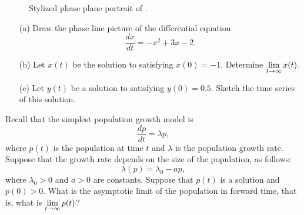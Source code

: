 \documentclass{ximera}
\begin{document}
\begin{figure}[htb]
           \centerline{%
           }
           \caption{Stylized phase plane portrait of \protect{}.}
           \label{F:gradexamstyle}
\end{figure}

\EXER

\TEXER

\begin{exercise} \label{c8.2.1}
\begin{enumerate}
\item[(a)] Draw the phase line picture of the differential
equation 
\begin{equation}  \label{E:quad}
\frac{dx}{dt} = -x^2 +3x -2.
\end{equation}
\item[(b)] Let $x(t)$ be the solution to  satisfying
$x(0)=-1$.  Determine $\displaystyle\lim_{t\to\infty} x(t)$. 
\item[(c)] Let $y(t)$ be a solution to  satisfying
$y(0)=0.5$. Sketch the time series of this solution.
\end{enumerate}
\end{exercise}

\begin{exercise} \label{E:popex}
Recall that the simplest population growth model
 is 
\[
\frac{dp}{dt} = \lambda p,
\]
where $p(t)$ is the population at time $t$ and $\lambda$ is the
population growth rate. Suppose that the growth rate depends on
the size of the population, as follows:
\[
\lambda(p) = \lambda_0 - ap,
\]
where $\lambda_0>0$ and $a>0$ are constants.  Suppose that
$p(t)$ is a solution and $p(0)>0$.  What is the asymptotic
limit of the population in forward time, that is, what is
$\displaystyle\lim_{t\to\infty} p(t)$?
\end{exercise}  
\end{document}
